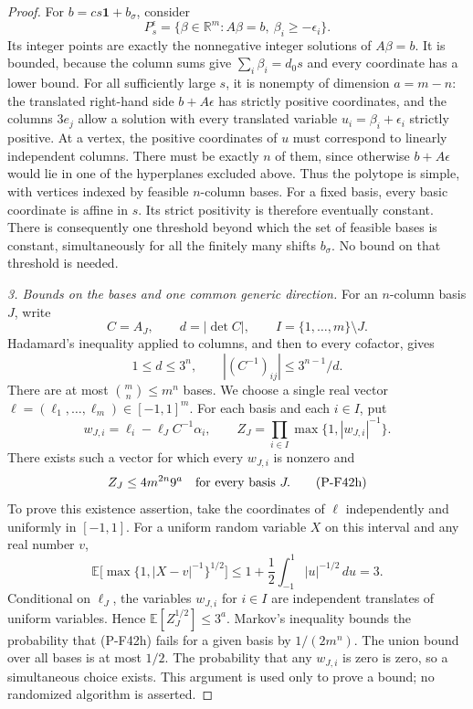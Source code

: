 \documentclass[11pt,a4paper]{article}
\begin{document}
\begin{proof}
For $b=cs\mathbf1+b_\sigma$, consider
\[
 P_s^\epsilon=
 \{\beta\in\mathbb R^m:A\beta=b,\ \beta_i\ge-\epsilon_i\}.
 \tag{P-F42e}
\]
Its integer points are exactly the nonnegative integer solutions
of $A\beta=b$. It is bounded, because the column sums give
$\sum_i\beta_i=d_0s$ and every coordinate has a lower bound.
For all sufficiently large $s$, it is nonempty of dimension
$a=m-n$: the translated right-hand side $b+A\epsilon$ has
strictly positive coordinates, and the columns $3e_j$ allow a
solution with every translated variable $u_i=\beta_i+\epsilon_i$
strictly positive.
At a vertex, the positive coordinates of $u$ must correspond
to linearly independent columns. There must be exactly $n$ of
them, since otherwise $b+A\epsilon$ would lie in one of the
hyperplanes excluded above. Thus the polytope is simple, with
vertices indexed by feasible $n$-column bases.
For a fixed basis, every basic coordinate is affine in $s$.
Its strict positivity is therefore eventually constant.
There is consequently one threshold beyond which the set of
feasible bases is constant, simultaneously for all the finitely
many shifts $b_\sigma$. No bound on that threshold is needed.

\emph{3. Bounds on the bases and one common generic direction.}
For an $n$-column basis $J$, write
\[
 C=A_J,\qquad d=|\det C|,\qquad I=\{1,\ldots,m\}\setminus J.
\]
Hadamard's inequality applied to columns, and then to every
cofactor, gives
\[
 1\le d\le3^n,\qquad
 |(C^{-1})_{ij}|\le 3^{n-1}/d.
 \tag{P-F42f}
\]
There are at most $\binom mn\le m^n$ bases.
We choose a single real vector
$\ell=(\ell_1,\ldots,\ell_m)\in[-1,1]^m$.
For each basis and each $i\in I$, put
\[
 w_{J,i}=\ell_i-\ell_J C^{-1}\alpha_i,\qquad
 Z_J=\prod_{i\in I}\max\{1,|w_{J,i}|^{-1}\}.
 \tag{P-F42g}
\]
There exists such a vector for which every $w_{J,i}$ is nonzero
and
\[
                 Z_J\le4m^{2n}9^a
                         \quad\hbox{for every basis }J.
 \tag{P-F42h}
\]
To prove this existence assertion, take the coordinates of
$\ell$ independently and uniformly in $[-1,1]$.
For a uniform random variable $X$ on this interval and any real
number $v$,
\[
 \mathbb E\bigl[\max\{1,|X-v|^{-1}\}^{1/2}\bigr]
 \le1+\frac12\int_{-1}^{1}|u|^{-1/2}\,du=3.
 \tag{P-F42i}
\]
Conditional on $\ell_J$, the variables $w_{J,i}$ for $i\in I$
are independent translates of uniform variables. Hence
$\mathbb E[Z_J^{1/2}]\le3^a$.
Markov's inequality bounds the probability that (P-F42h) fails
for a given basis by $1/(2m^n)$. The union bound over all bases
is at most $1/2$. The probability that any $w_{J,i}$ is zero is
zero, so a simultaneous choice exists. This argument is used
only to prove a bound; no randomized algorithm is asserted.


\end{proof}
\end{document}

